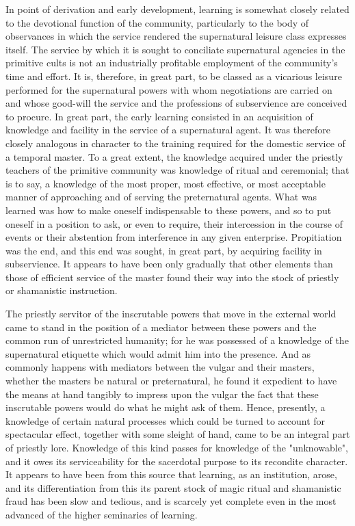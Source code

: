 \documentclass[12pt]{report}
\begin{document}
In point of derivation and early development, learning is somewhat
closely related to the devotional function of the community,
particularly to the body of observances in which the service rendered
the supernatural leisure class expresses itself. The service by which it
is sought to conciliate supernatural agencies in the primitive cults is
not an industrially profitable employment of the community's time and
effort. It is, therefore, in great part, to be classed as a vicarious
leisure performed for the supernatural powers with whom negotiations
are carried on and whose good-will the service and the professions of
subservience are conceived to procure. In great part, the early learning
consisted in an acquisition of knowledge and facility in the service of
a supernatural agent. It was therefore closely analogous in character to
the training required for the domestic service of a temporal master. To
a great extent, the knowledge acquired under the priestly teachers of
the primitive community was knowledge of ritual and ceremonial; that
is to say, a knowledge of the most proper, most effective, or most
acceptable manner of approaching and of serving the preternatural
agents. What was learned was how to make oneself indispensable to these
powers, and so to put oneself in a position to ask, or even to require,
their intercession in the course of events or their abstention from
interference in any given enterprise. Propitiation was the end, and this
end was sought, in great part, by acquiring facility in subservience.
It appears to have been only gradually that other elements than those
of efficient service of the master found their way into the stock of
priestly or shamanistic instruction.

The priestly servitor of the inscrutable powers that move in the
external world came to stand in the position of a mediator between these
powers and the common run of unrestricted humanity; for he was possessed
of a knowledge of the supernatural etiquette which would admit him into
the presence. And as commonly happens with mediators between the vulgar
and their masters, whether the masters be natural or preternatural, he
found it expedient to have the means at hand tangibly to impress upon
the vulgar the fact that these inscrutable powers would do what he might
ask of them. Hence, presently, a knowledge of certain natural processes
which could be turned to account for spectacular effect, together with
some sleight of hand, came to be an integral part of priestly lore.
Knowledge of this kind passes for knowledge of the "unknowable", and
it owes its serviceability for the sacerdotal purpose to its recondite
character. It appears to have been from this source that learning, as an
institution, arose, and its differentiation from this its parent stock
of magic ritual and shamanistic fraud has been slow and tedious, and is
scarcely yet complete even in the most advanced of the higher seminaries
of learning.
\end{document}
